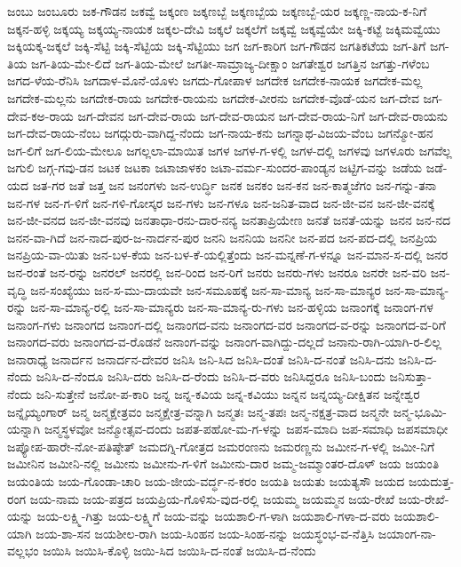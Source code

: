 ಜಂಬು
ಜಂಬೂರು
ಜಕ-ಗೌಡನ
ಜಕವ್ವೆ
ಜಕ್ಕಂಣ
ಜಕ್ಕಣಬ್ಬೆ
ಜಕ್ಕಣಬ್ಬೆಯ
ಜಕ್ಕಣಬ್ಬೆ-ಯರ
ಜಕ್ಕಣ್ಣ-ನಾಯ-ಕ-ನಿಗೆ
ಜಕ್ಕನ-ಹಳ್ಳಿ
ಜಕ್ಕಯ್ಯ
ಜಕ್ಕಯ್ಯ-ನಾಯಕ
ಜಕ್ಕಲ-ದೇವಿ
ಜಕ್ಕಲೆ
ಜಕ್ಕಲೆಗೆ
ಜಕ್ಕವ್ವೆ
ಜಕ್ಕವ್ವೆಯೇ
ಜಕ್ಕಿ-ಕಟ್ಟೆ
ಜಕ್ಕಿಮವ್ವೆಯು
ಜಕ್ಕಿಯಕ್ಕ-ಜಕ್ಕಲೆ
ಜಕ್ಕಿ-ಸೆಟ್ಟಿ
ಜಕ್ಕಿ-ಸೆಟ್ಟಿಯ
ಜಕ್ಕಿ-ಸೆಟ್ಟಿಯು
ಜಗ
ಜಗ-ಕಾರಿಗ
ಜಗ-ಗೌಡನ
ಜಗತಿಕಟೆಯ
ಜಗ-ತಿಗೆ
ಜಗ-ತಿಯ
ಜಗ-ತಿಯ-ಮೇ-ಲಿದೆ
ಜಗ-ತಿಯ-ಮೇಲೆ
ಜಗತೀ-ಸಾಮ್ರಾಜ್ಯ-ದೀಕ್ಷಾಂ
ಜಗತೇಶ್ವರ
ಜಗತ್ತಿನ
ಜಗತ್ತು-ಗಳೆಂಬ
ಜಗದ-ಳೆಯ-ರೆನಿಸಿ
ಜಗದಾಳ-ಮೊನೆ-ಯೊಳು
ಜಗದು-ಗೋಪಾಳ
ಜಗದೇಕ
ಜಗದೇಕ-ನಾಯಕ
ಜಗದೇಕ-ಮಲ್ಲ
ಜಗದೇಕ-ಮಲ್ಲನು
ಜಗದೇಕ-ರಾಯ
ಜಗದೇಕ-ರಾಯನು
ಜಗದೇಕ-ವೀರನು
ಜಗದೇಕ-ವೊಡೆ-ಯನ
ಜಗ-ದೇವ
ಜಗ-ದೇವ-ಕಅ-ರಾಯ
ಜಗ-ದೇವನ
ಜಗ-ದೇವ-ರಾಯ
ಜಗ-ದೇವ-ರಾಯನ
ಜಗ-ದೇವ-ರಾಯ-ನಿಗೆ
ಜಗ-ದೇವ-ರಾಯನು
ಜಗ-ದೇವ-ರಾಯ-ನೆಂಬ
ಜಗದ್ಗುರು-ವಾಗಿದ್ದ-ನೆಂದು
ಜಗ-ನಾಯ-ಕನು
ಜಗನ್ನಾಥ-ವಿಜಯ-ವೆಂಬ
ಜಗನ್ಮೋ-ಹನ
ಜಗ-ಲಿಗೆ
ಜಗ-ಲಿಯ-ಮೇಲೂ
ಜಗಲ್ಲಲಾ-ಮಾಯಿತ
ಜಗಳ
ಜಗಳ-ಗ-ಳಲ್ಲಿ
ಜಗಳ-ದಲ್ಲಿ
ಜಗಳವು
ಜಗಳೂರು
ಜಗವೆಲ್ಲ
ಜಗುಲಿ
ಜಗ್ಗ-ಗವು-ಡನ
ಜಟಕ
ಜಟಕಾ
ಜಟಾಜಾಳಕಂ
ಜಟಾ-ವರ್ಮ-ಸುಂದರ-ಪಾಂಡ್ಯನ
ಜಟ್ಟಿಗ-ವನ್ನು
ಜಡೆಯ
ಜಡೆ-ಯದ
ಜತ-ಗರ
ಜತೆ
ಜತ್ತ
ಜನ
ಜನಂಗಳು
ಜನ-ಉರ್ದ್ಧಿ
ಜನಕ
ಜನಕಂ
ಜನ-ಕನ
ಜನ-ಕಾತ್ಮಜೆಗಂ
ಜನ-ಗನ್ನು-ತನಾ
ಜನ-ಗಳ
ಜನ-ಗ-ಳಿಗೆ
ಜನ-ಗಳಿ-ಗೋಸ್ಕರ
ಜನ-ಗಳು
ಜನ-ಗಳೂ
ಜನ-ಜನಿತ-ವಾದ
ಜನ-ಜೀ-ವನ
ಜನ-ಜೀ-ವನಕ್ಕೆ
ಜನ-ಜೀ-ವನದ
ಜನ-ಜೀ-ವನವು
ಜನತಾಧಾ-ರನು-ದಾರ-ನನ್ಯ
ಜನತಾಪ್ರಿಯೇಣ
ಜನತೆ
ಜನತೆ-ಯನ್ನು
ಜನನ
ಜನ-ನದ
ಜನನ-ವಾ-ಗಿದೆ
ಜನ-ನಾದ-ಪುರ-ಜ-ನಾರ್ದನ-ಪುರ
ಜನನಿ
ಜನನಿಯ
ಜನನೀ
ಜನ-ಪದ
ಜನ-ಪದ-ದಲ್ಲಿ
ಜನಪ್ರಿಯ
ಜನಪ್ರಿಯ-ವಾ-ಯಿತು
ಜನ-ಬಳ-ಕೆಯ
ಜನ-ಬಳ-ಕೆ-ಯಲ್ಲಿತ್ತೆಂದು
ಜನ-ಮನ್ನಣೆ-ಗ-ಳನ್ನೂ
ಜನ-ಮಾನ-ಸ-ದಲ್ಲಿ
ಜನರ
ಜನ-ರಂತೆ
ಜನ-ರನ್ನು
ಜನರಲ್
ಜನರಲ್ಲಿ
ಜನ-ರಿಂದ
ಜನ-ರಿಗೆ
ಜನರು
ಜನರು-ಗಳು
ಜನರೂ
ಜನರೇ
ಜನ-ವರಿ
ಜನ-ವೃದ್ಧಿ
ಜನ-ಸಂಖ್ಯೆಯು
ಜನ-ಸ-ಮು-ದಾಯವೇ
ಜನ-ಸಮೂಹಕ್ಕೆ
ಜನ-ಸಾ-ಮಾನ್ಯ
ಜನ-ಸಾ-ಮಾನ್ಯರ
ಜನ-ಸಾ-ಮಾನ್ಯ-ರನ್ನು
ಜನ-ಸಾ-ಮಾನ್ಯ-ರಲ್ಲಿ
ಜನ-ಸಾ-ಮಾನ್ಯರು
ಜನ-ಸಾ-ಮಾನ್ಯ-ರು-ಗಳು
ಜನ-ಹಳ್ಳಿಯ
ಜನಾಂಗಕ್ಕೆ
ಜನಾಂಗ-ಗಳ
ಜನಾಂಗ-ಗಳು
ಜನಾಂಗದ
ಜನಾಂಗ-ದಲ್ಲಿ
ಜನಾಂಗದ-ವನು
ಜನಾಂಗದ-ವರ
ಜನಾಂಗದ-ವ-ರನ್ನು
ಜನಾಂಗದ-ವ-ರಿಗೆ
ಜನಾಂಗದ-ವರು
ಜನಾಂಗದ-ವ-ರೊಡನೆ
ಜನಾಂಗ-ವನ್ನು
ಜನಾಂಗ-ವಾಗಿದ್ದು-ದಲ್ಲದೆ
ಜನಾನು-ರಾಗಿ-ಯಾಗಿ-ರ-ಲಿಲ್ಲ
ಜನಾರಾಧ್ಯೆ
ಜನಾರ್ದನ
ಜನಾರ್ದನ-ದೇವರ
ಜನಿಸಿ
ಜನಿ-ಸಿದ
ಜನಿಸಿ-ದಂತೆ
ಜನಿಸಿ-ದ-ನಂತೆ
ಜನಿಸಿ-ದನು
ಜನಿಸಿ-ದ-ನೆಂದು
ಜನಿಸಿ-ದ-ನೆಂದೂ
ಜನಿಸಿ-ದರು
ಜನಿಸಿ-ದ-ರೆಂದು
ಜನಿಸಿ-ದ-ವರು
ಜನಿಸಿದ್ದರೂ
ಜನಿಸಿ-ಬಂದು
ಜನಿಸುತ್ತಾ-ನೆಂದು
ಜನಿ-ಸುತ್ತೇನೆ
ಜನೋ-ಪ-ಕಾರಿ
ಜನ್ನ
ಜನ್ನ-ಕವಿಯ
ಜನ್ನ-ಕವಿಯು
ಜನ್ನನ
ಜನ್ನಯ್ಯ-ದೀಕ್ಷಿತನ
ಜನ್ನೇಶ್ವರ
ಜನ್ನೈಯ್ಯಂಗಾರ್
ಜನ್ಮ
ಜನ್ಮಕ್ಷೇತ್ರವಂ
ಜನ್ಮಕ್ಷೇತ್ರ-ವನ್ನಾಗಿ
ಜನ್ಮತಃ
ಜನ್ಮ-ತಪಃ
ಜನ್ಮ-ನಕ್ಷತ್ರ-ವಾದ
ಜನ್ಮನೇ
ಜನ್ಮ-ಭೂಮಿ-ಯನ್ನಾಗಿ
ಜನ್ಮಸ್ಥಳವೋ
ಜನ್ಮೋತ್ಸವ-ದಂದು
ಜಪತ-ಪಹೋ-ಮ-ಗ-ಳನ್ನು
ಜಪಸ-ಮಾದಿ
ಜಪ-ಸಮಾಧಿ
ಜಪಸಮಾಧೀ
ಜಪ್ಯೋಪ-ಹಾರೇ-ನೋ-ಪತಿಷ್ಠೇತ್
ಜಮದಗ್ನಿ-ಗೋತ್ರದ
ಜಮರಂಣನು
ಜಮರಣ್ಣನು
ಜಮೀನ-ಗ-ಳಲ್ಲಿ
ಜಮೀ-ನಿಗೆ
ಜಮೀನಿನ
ಜಮೀನಿ-ನಲ್ಲಿ
ಜಮೀನು
ಜಮೀನು-ಗ-ಳಿಗೆ
ಜಮೀನು-ದಾರ
ಜಮ್ಮ-ಜಮ್ಮಾಂತರ-ದೊಳ್
ಜಯ
ಜಯಂತಿ
ಜಯಂತಿಯ
ಜಯ-ಗೊಂಡಾ-ಚಾರಿ
ಜಯ-ಜೀಯ-ವರ್ದ್ಧ-ನ-ಕರಂ
ಜಯತಿ
ಜಯತು
ಜಯತ್ಯಸೌ
ಜಯದ
ಜಯದುತ್ತ-ರಂಗ
ಜಯ-ನಾಮ
ಜಯ-ಪತ್ರದ
ಜಯಪ್ರಿಯ-ಗೊಳಿಸು-ವುದ-ರಲ್ಲಿ
ಜಯಮ್ಮ
ಜಯಮ್ಮನ
ಜಯ-ರೇಖೆ
ಜಯ-ರೇಖೆ-ಯನ್ನು
ಜಯ-ಲಕ್ಷ್ಮಿ-ಗಿತ್ತು
ಜಯ-ಲಕ್ಷ್ಮಿಗೆ
ಜಯ-ವನ್ನು
ಜಯಶಾಲಿ-ಗ-ಳಾಗಿ
ಜಯಶಾಲಿ-ಗಳಾ-ದ-ವರು
ಜಯಶಾಲಿ-ಯಾಗಿ
ಜಯ-ಶಾ-ಸನ
ಜಯಶೀಲ-ರಾಗಿ
ಜಯ-ಸಿಂಹನ
ಜಯ-ಸಿಂಹ-ನನ್ನು
ಜಯಸ್ಥಂಭ-ವ-ನೆತ್ತಿಸಿ
ಜಯಾಂಗ-ನಾ-ವಲ್ಲಭಂ
ಜಯಿಸಿ
ಜಯಿಸಿ-ಕೊಳ್ಳಿ
ಜಯಿ-ಸಿದ
ಜಯಿಸಿ-ದ-ನಂತೆ
ಜಯಿಸಿ-ದ-ನೆಂದು
